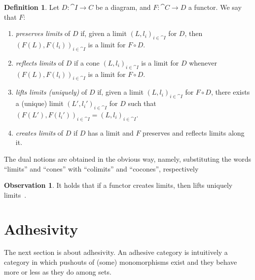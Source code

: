 \documentclass[a4paper, twoside,openright]{report}
\theoremstyle{plain}
\theoremstyle{definition}
\newtheorem{definition}[theorem]{Definition}
\newtheorem{obs}[theorem]{Observation}
\begin{document}
\begin{definition}
    Let $D : \cat{I \rightarrow C}$ be a diagram, and $F: \cat{C \rightarrow D}$ a functor. We say that $F$:
    \begin{enumerate}
        \item \emph{preserves limits} of $D$ if, given a limit $(L, l_i)_{i \in \cat I}$ for $D$, then $(F(L), F(l_i))_{i \in \cat I}$ is a limit for $F \circ D$.
        \item \emph{reflects limits} of $D$ if a cone $(L, l_i)_{i \in \cat I}$ is a limit for $D$ whenever $(F(L), F(l_i))_{i \in \cat I}$ is a limit for $F \circ D$.
        \item \emph{lifts limits (uniquely)} of $D$ if, given a limit $(L, l_i)_{i \in \cat I}$ for $F \circ D$, there exists a (unique) limit $(L', l_i')_{i \in \cat I}$ for $D$ such that $(F(L'), F(l_i'))_{i \in \cat I} = (L, l_i)_{i \in \cat I}$.
        \item \emph{creates limits} of $D$ if $D$ has a limit and $F$ preserves and reflects limits along it.
    \end{enumerate}
    The dual notions are obtained in the obvious way, namely, substituting the words ``limits'' and ``cones'' with ``colimits'' and ``cocones'', respectively
\end{definition}

\begin{obs}\label{obs:funct_creat_lim_then_lift}
    It holds that if a functor creates limits, then lifts uniquely limits~\cite{Adamek_Herrlich_Strecker_2009}.
\end{obs}

\section{Adhesivity}\label{sect:adh}

The next section is about adhesivity.
An adhesive category is intuitively a category in which pushouts of (some) monomorphisms exist and they behave more or less as they do among sets. 
\end{document}
